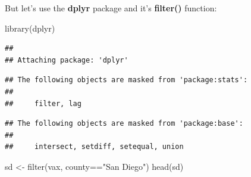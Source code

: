 \documentclass[
]{article}
\newenvironment{Shaded}{\begin{snugshade}}{\end{snugshade}}
\newcommand{\FunctionTok}[1]{\textcolor[rgb]{0.00,0.00,0.00}{#1}}
\newcommand{\NormalTok}[1]{#1}
\newcommand{\OtherTok}[1]{\textcolor[rgb]{0.56,0.35,0.01}{#1}}
\newcommand{\SpecialCharTok}[1]{\textcolor[rgb]{0.00,0.00,0.00}{#1}}
\newcommand{\StringTok}[1]{\textcolor[rgb]{0.31,0.60,0.02}{#1}}
\begin{document}
But let's use the \textbf{dplyr} package and it's \textbf{filter()}
function:

\begin{Shaded}
\begin{Highlighting}[]
\FunctionTok{library}\NormalTok{(dplyr)}
\end{Highlighting}
\end{Shaded}

\begin{verbatim}
## 
## Attaching package: 'dplyr'
\end{verbatim}

\begin{verbatim}
## The following objects are masked from 'package:stats':
## 
##     filter, lag
\end{verbatim}

\begin{verbatim}
## The following objects are masked from 'package:base':
## 
##     intersect, setdiff, setequal, union
\end{verbatim}

\begin{Shaded}
\begin{Highlighting}[]
\NormalTok{sd }\OtherTok{\textless{}{-}} \FunctionTok{filter}\NormalTok{(vax, county}\SpecialCharTok{==}\StringTok{"San Diego"}\NormalTok{)}
\FunctionTok{head}\NormalTok{(sd)}
\end{Highlighting}
\end{Shaded}
\end{document}
